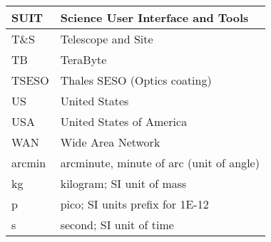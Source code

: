 \begin{longtable}{|l|p{}|}
SUIT & Science User Interface and Tools \\\hline
T\&S & Telescope and Site \\\hline
TB & TeraByte \\\hline
TSESO & Thales SESO (Optics coating) \\\hline
US & United States \\\hline
USA & United States of America \\\hline
WAN & Wide Area Network \\\hline
arcmin & arcminute, minute of arc (unit of angle) \\\hline
kg & kilogram; SI unit of mass \\\hline
p & pico; SI units prefix for 1E-12 \\\hline
s & second; SI unit of time \\\hline
\end{longtable}
